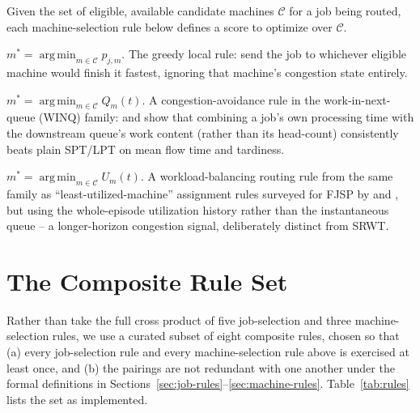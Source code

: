 \documentclass[conference]{IEEEtran}
\newcommand{\argmin}{\operatorname*{arg\,min}}
\begin{document}
Given the set of eligible, available candidate machines $\mathcal{C}$ for a job being
routed, each machine-selection rule below defines a score to optimize over
$\mathcal{C}$.

\begin{description}[style=nextline, leftmargin=1em]
  \item[SMPT (Shortest Machine Processing Time)]
    $m^\ast = \argmin_{m \in \mathcal{C}} p_{j,m}$. The greedy local rule: send the
    job to whichever eligible machine would finish it fastest, ignoring that
    machine's congestion state entirely.
  \item[SRWT (Shortest Remaining Work Time, i.e., minimum queued workload)]
    $m^\ast = \argmin_{m \in \mathcal{C}} Q_m(t)$. A congestion-avoidance rule in the
    work-in-next-queue (WINQ) family: \cite{holthaus1997} and
    \cite{rajendran1999} show that combining a job's own processing time with the
    downstream queue's work content (rather than its head-count) consistently beats
    plain SPT/LPT on mean flow time and tardiness.
  \item[MMUR (Minimum Machine Utilization)]
    $m^\ast = \argmin_{m \in \mathcal{C}} U_m(t)$. A workload-balancing routing rule
    from the same family as ``least-utilized-machine'' assignment rules surveyed for
    FJSP by \cite{xie2019} and \cite{chaudhry2016}, but using the whole-episode
    utilization history rather than the instantaneous queue -- a longer-horizon
    congestion signal, deliberately distinct from SRWT.
\end{description}

\section{The Composite Rule Set}
\label{sec:rule-set}

Rather than take the full cross product of five job-selection and three
machine-selection rules, we use a curated subset of eight composite rules, chosen so
that (a) every job-selection rule and every machine-selection rule above is exercised
at least once, and (b) the pairings are not redundant with one another under the
formal definitions in Sections~\ref{sec:job-rules}--\ref{sec:machine-rules}.
Table~\ref{tab:rules} lists the set as implemented.
\end{document}
